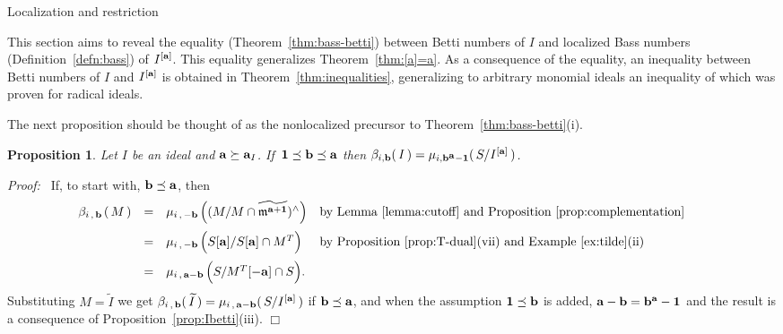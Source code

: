 \documentclass[12pt,leqno]{article}
\newtheorem{prop}[thm]{Proposition}
\def\aa{{{\rm \bf a}}}
\def\bb{{{\rm \bf b}}}
\def\mm{{\mathfrak m}}
\begin{document}
\begin{section}{Localization and restriction}%


\label{section:localize}


This section aims to reveal the equality (Theorem~\ref{thm:bass-betti})
between Betti numbers of $I$ and localized Bass numbers
(Definition~\ref{defn:bass}) of $I^{[\aa]}$.  This equality generalizes
Theorem~\ref{thm:[a]=a}.  As a consequence of the equality, an inequality
between Betti numbers of $I$ and $I^{[\aa]}$ is obtained in
Theorem~\ref{thm:inequalities}, generalizing to arbitrary monomial ideals
an inequality of \cite{BCP} which was proven for radical ideals.

The next proposition should be thought of as the nonlocalized precursor
to Theorem~\ref{thm:bass-betti}(i).
\begin{prop} \label{prop:precursor}
Let $I$ be an ideal and $\aa \succeq \aa_I$.  If \,${\bf 1} \preceq \bb
\preceq \aa$ then $\beta_{i,\bb}(\,I\,) = \mu_{i,\bb^{\scriptstyle \aa} -
{\bf 1}}(\,S / I^{[\aa]}\,)$.
\end{prop}
{\it Proof:\ } If, to start with, $\bb \preceq \aa$, then 
$$
\begin{array}{rcll}
\beta_{i\,,\,\bb\,}(\,M\,)
& = &
	\mu_{i\,,\,-\bb\,}\Bigl( (M / M \cap \widetilde{\mm^{\aa + {\bf
	1}}})^\wedge \Bigr) &
	\hbox{by Lemma~\ref{lemma:cutoff} and
		Proposition~\ref{prop:complementation} }
\phantom{\displaystyle \sum_{.}} \cr
& = &
	\mu_{i\,,\,-\bb\,}\Bigl( S[\aa] / S[\aa] \cap M^T \Bigr) &
	\hbox{by Proposition~\ref{prop:T-dual}(vii) and 
	Example~\ref{ex:tilde}(ii)}
\phantom{\displaystyle \sum_{.}} \cr
& = &
	\mu_{i\,,\,\aa-\bb\,}\Bigl( S / M^T[-\aa] \cap S
	\Bigr). & \cr
\end{array}
$$
Substituting $M = \widetilde{I}$ we get $\beta_{i\,,\,\bb}
(\,\widetilde{I}\,) = \mu_{i\,,\,\aa-\bb}(\,S/I^{[\aa]}\,) $ if $\bb
\preceq \aa$, and when the assumption ${\bf 1} \preceq \bb$ is added,
$\aa-\bb = \bb^\aa - {\bf 1}$ and  the result is a consequence of
Proposition~\ref{prop:Ibetti}(iii).
%
\hfill
$\Box$
\vskip 2mm


\end{section}
\end{document}
